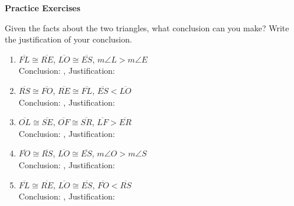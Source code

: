 \def\figdir{/storage/emulated/0/Documents/documents/latex/1920/Grade-8/3rd/inequalities-in-two-triangles/f}

\textbf{Practice Exercises}

\vspce

Given the facts about the two triangles, what conclusion can you make? Write the justification of your conclusion.



\begin{enumerate}[label = \arabic*. ]
\item $\overline{FL} \cong \overline{RE}$, $\overline{LO} \cong \overline{ES}$, $m\angle{L} > m\angle{E}$ \\
Conclusion: \blank,  Justification: \blank 
\item $\overline{RS} \cong \overline{FO}$, $\overline{RE} \cong \overline{FL}$, $\overline{ES} < \overline{LO} $ \\
Conclusion: \blank,  Justification: \blank 
\item $\overline{OL} \cong \overline{SE}$, $\overline{OF} \cong \overline{SR}$, $\overline{LF} > \overline{ER} $ \\
Conclusion: \blank,  Justification: \blank 
\item $\overline{FO} \cong \overline{RS}$, $\overline{LO} \cong \overline{ES}$, $m\angle{O} > m\angle{S}$ \\
Conclusion: \blank,  Justification: \blank 
\item $\overline{FL} \cong \overline{RE}$, $\overline{LO} \cong \overline{ES}$, $\overline{FO} < \overline{RS} $ \\
Conclusion: \blank,  Justification: \blank 
\end{enumerate}  